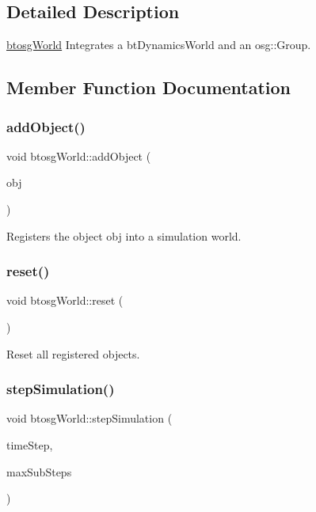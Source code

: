 \subsection{Detailed Description}
\hyperlink{classbtosgWorld}{btosg\+World} Integrates a bt\+Dynamics\+World and an osg\+::\+Group. 

\subsection{Member Function Documentation}
\mbox{\label{classbtosgWorld_ae5b71c6319dd420479096a265a1725b7}} 
\subsubsection{\texorpdfstring{add\+Object()}{addObject()}}
{\footnotesize\ttfamily void btosg\+World\+::add\+Object (\begin{DoxyParamCaption}\item[{class \hyperlink{classbtosgObject}{btosg\+Object} $\ast$}]{obj }\end{DoxyParamCaption})}

Registers the object obj into a simulation world. \mbox{\label{classbtosgWorld_a6af4d066410a86b44fff5563667ea9a9}} 
\subsubsection{\texorpdfstring{reset()}{reset()}}
{\footnotesize\ttfamily void btosg\+World\+::reset (\begin{DoxyParamCaption}{ }\end{DoxyParamCaption})}

Reset all registered objects. \mbox{\label{classbtosgWorld_afce096686d8f84afd8b8fa3f2dc161b8}} 
\subsubsection{\texorpdfstring{step\+Simulation()}{stepSimulation()}}
{\footnotesize\ttfamily void btosg\+World\+::step\+Simulation (\begin{DoxyParamCaption}\item[{bt\+Scalar}]{time\+Step,  }\item[{int}]{max\+Sub\+Steps }\end{DoxyParamCaption})}

